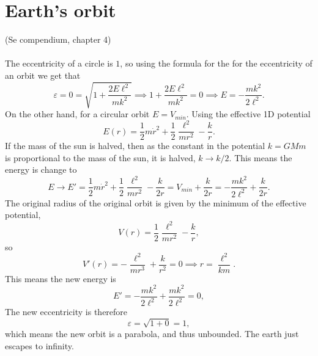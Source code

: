 \documentclass{article}
\begin{document}
    \section{Earth's orbit}
        (Se compendium, chapter 4) \\ \\
        The eccentricity of a circle is $1$, so using the formula for the for the eccentricity of an orbit we get that
        \begin{equation*}
            \varepsilon = 0 = \sqrt{1 + \frac{2 E \ell^2}{m k^2}} \implies 1 + \frac{2 E \ell^2}{m k^2} = 0 \implies E = - \frac{m k^2}{2 \ell^2}.
        \end{equation*}
        On the other hand, for a circular orbit $E = V_{min}$. Using the effective 1D potential 
        \begin{equation*}
            E(r) = \frac{1}{2}m \dot r^2 + \frac{1}{2} \frac{\ell^2}{m r^2} - \frac{k}{r}.
        \end{equation*}
        If the mass of the sun is halved, then as the constant in the potential $k = GMm$ is proportional to the mass of the sun, it is halved, $k \rightarrow k/2$. This means the energy is change to
        \begin{equation*}
            E \rightarrow E' = \frac{1}{2}m \dot r^2 + \frac{1}{2} \frac{\ell^2}{m r^2} - \frac{k}{2r} = V_{min} + \frac{k}{2r} = - \frac{m k^2}{2 \ell^2} + \frac{k}{2 r}.
        \end{equation*}
        The original radius of the original orbit is given by the minimum of the effective potential,
        \begin{equation*}
            V(r) =  \frac{1}{2} \frac{\ell^2}{m r^2} - \frac{k}{r},
        \end{equation*}
        so
        \begin{equation*}
            V'(r) = -\frac{\ell^2}{m r^3} + \frac{k}{r^2} = 0 \implies r = \frac{\ell^2}{k m}.
        \end{equation*}
        This means the new energy is 
        \begin{equation*}
            E' = -\frac{m k^2 }{2 \ell^2} + \frac{mk^2}{2 \ell^2} = 0,
        \end{equation*}
        The new eccentricity is therefore 
        \begin{equation*}
            \varepsilon = \sqrt{1 + 0} = 1,
        \end{equation*}
        which means the new orbit is a parabola, and thus unbounded. The earth just escapes to infinity.
\end{document}
